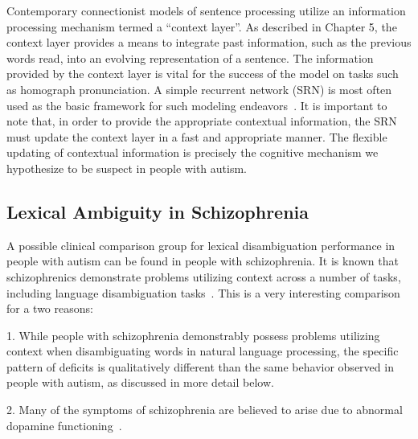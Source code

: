 \documentclass[man]{apa}
\begin{document}
Contemporary connectionist models of sentence processing utilize an information processing mechanism termed a ``context layer''.  As described in Chapter 5, the context layer provides a means to integrate past information, such as the previous words read, into an evolving representation of a sentence.  The information provided by the context layer is vital for the success of the model on tasks such as homograph pronunciation.  A simple recurrent network (SRN) is most often used as the basic framework for such modeling endeavors~\cite{ElmanJ:1990:SRN}.  It is important to note that, in order to provide the appropriate contextual information, the SRN must update the context layer in a fast and appropriate manner.  The flexible updating of contextual information is precisely the cognitive mechanism we hypothesize to be suspect in people with autism.  

\subsection{Lexical Ambiguity in Schizophrenia}
A possible clinical comparison group for lexical disambiguation performance in people with autism can be found in people with schizophrenia.  It is known that schizophrenics demonstrate problems utilizing context across a number of tasks, including language disambiguation tasks~\cite{CohenJD:1992:Schizophrenia}.  This is a very interesting comparison for a two reasons:

1.  While people with schizophrenia demonstrably possess problems utilizing context when disambiguating words in natural language processing, the specific pattern of deficits is qualitatively different than the same behavior observed in people with autism, as discussed in more detail below.

2.  Many of the symptoms of schizophrenia are believed to arise due to abnormal dopamine functioning~\cite{CohenJD:1992:Schizophrenia}.  
\end{document}
